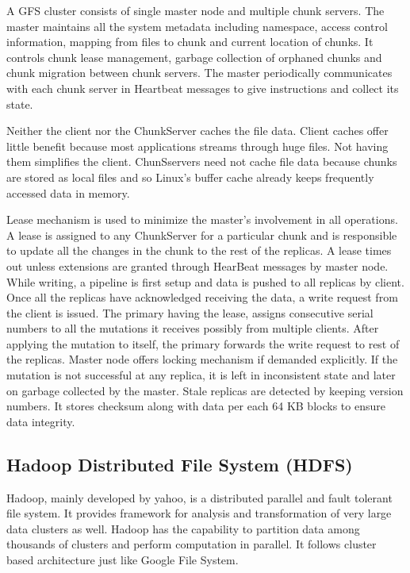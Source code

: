 \documentclass[a4paper,12pt]{article}
\begin{document}
A GFS cluster consists of single master node and multiple chunk servers. The master maintains all the system metadata including namespace, access control information, mapping from files to chunk and current location of chunks. It controls chunk lease management, garbage collection of orphaned chunks and chunk migration between chunk servers. The master periodically communicates with each chunk server in Heartbeat messages to give instructions and collect its state.

Neither the client nor the ChunkServer caches the file data. Client caches offer little benefit because most applications streams through huge files. Not having them simplifies the client. ChunSservers need not cache file data because chunks are stored as local files and so Linux's buffer cache already keeps frequently accessed data in memory.

Lease mechanism is used to minimize the master's involvement in all operations. A lease is assigned to any ChunkServer for a particular chunk and is responsible to update all the changes in the chunk to the rest of the replicas. A lease times out unless extensions are granted through HearBeat messages by master node. While writing, a pipeline is first setup and data is pushed to all replicas by client. Once all the replicas have acknowledged receiving the data, a write request from the client is issued. The primary having the lease, assigns consecutive serial numbers to all the mutations it receives possibly from multiple clients. After applying the mutation to itself, the primary forwards the write request to rest of the replicas. Master node offers locking mechanism if demanded explicitly. If the mutation is not successful at any replica, it is left in inconsistent state and later on garbage collected by the master. Stale replicas are detected by keeping version numbers. It stores checksum along with data per each 64 KB blocks to ensure data integrity.

\subsection{Hadoop Distributed File System (HDFS) \cite{hadoop}}
\label{sec:hdfs}
Hadoop, mainly developed by yahoo, is a distributed parallel and fault tolerant file system. It provides framework for analysis and transformation of very large data clusters as well. Hadoop has the capability to partition data among thousands of clusters and perform computation in parallel. It follows cluster based architecture just like Google File System.
\end{document}
